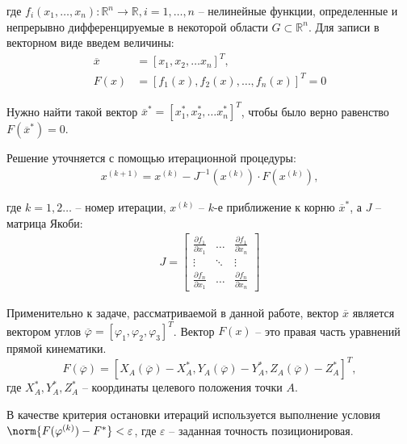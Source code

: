 \noindent где $ f_i(x_1,\dots,x_n): \mathbb{R}^n \rightarrow \mathbb{R}, i=1,\dots, n $ -- нелинейные функции, определенные и непрерывно дифференцируемые в некоторой области $ G \subset \mathbb{R}^n $. Для записи в векторном виде введем величины:
\begin{align*}
    \overline{x} &= [x_1, x_2, \dots x_n]^T, \\
    F(x) &= [f_1(x), f_2(x),\dots,f_n(x)]^T = 0
\end{align*}

Нужно найти такой вектор $ \overline{x}^*=[x_1^*, x_2^*, \dots x_n^*]^T $, чтобы было верно равенство $ F(\overline{x}^*) = 0 $. 

Решение уточняется с помощью итерационной процедуры:
\begin{align*} %
    x^{(k+1)}=x^{(k)}-J^{-1}(x^{(k)}) \cdot F(x^{(k)}),
\end{align*} %

\noindent где $ k=1,2\dots $ -- номер итерации, $ x^{(k)} $ -- $k$-е приближение к корню $ \overline{x}^* $, а $ J $ -- матрица Якоби:
\begin{align*}
    J = \begin{bmatrix}
        \frac{\partial f_1}{\partial x_1} & \dots & \frac{\partial f_1}{\partial x_n} \\
        \vdots & \ddots & \vdots \\
        \frac{\partial f_n}{\partial x_1} & \dots & \frac{\partial f_n}{\partial x_n}
    \end{bmatrix}
\end{align*}

Применительно к задаче, рассматриваемой в данной работе, вектор $ \overline{x} $ является  вектором углов $ \overline{\varphi} = [ \varphi_1, \varphi_2, \varphi_3 ]^T $. Вектор $ F(x) $ -- это правая часть уравнений прямой кинематики.
\begin{equation*}
    F(\overline{\varphi}) = [ X_A(\overline{\varphi}) - X_A^*, Y_A(\overline{\varphi}) - Y_A^*, Z_A(\overline{\varphi}) - Z_A^* ]^T,
\end{equation*}
где $ X_A^*, Y_A^*, Z_A^* $ -- координаты целевого положения точки $A$.

В качестве критерия остановки итераций используется выполнение условия $ \norm{F(\varphi^{(k)}) - F^* } < \varepsilon $, где $\varepsilon $ -- заданная точность позиционировая.

